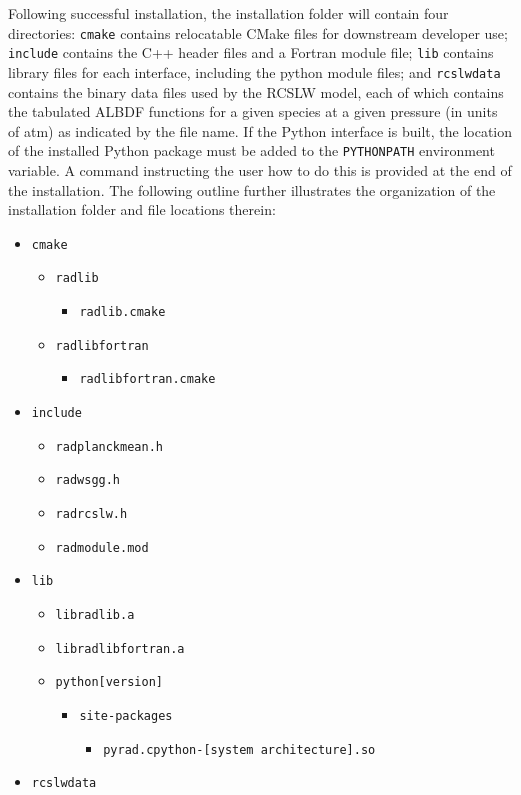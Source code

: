 \documentclass[preprint,12pt]{elsarticle}
\begin{document}
Following successful installation, the installation folder will contain four directories:
\texttt{cmake} contains relocatable CMake files for downstream developer use;
\texttt{include} contains the C++ header files and a Fortran module file;
\texttt{lib} contains library files for each interface, including the python module files;
and \texttt{rcslw\textunderscore data} contains the binary data files used by the RCSLW model, each of which
contains the tabulated ALBDF functions for a given species at a given pressure (in units of atm) as indicated by the file name. If the Python interface is built, the location of the installed Python package must be added to the \texttt{PYTHONPATH} environment variable. A command instructing the user how to do this is provided at the end of the installation. The following outline further illustrates the organization of the installation folder and file locations therein:
%
\begin{itemize}
    \item \texttt{cmake}
    \begin{itemize}
        \item \texttt{radlib}
        \begin{itemize}
            \item \texttt{radlib.cmake}
        \end{itemize}
        \item \texttt{radlib\textunderscore fortran}
        \begin{itemize}
            \item \texttt{radlib\textunderscore fortran.cmake}
        \end{itemize}
    \end{itemize}
    \item \texttt{include}
    \begin{itemize}
        \item \texttt{rad\textunderscore planck\textunderscore mean.h}
        \item \texttt{rad\textunderscore wsgg.h}
        \item \texttt{rad\textunderscore rcslw.h}
        \item \texttt{rad\textunderscore module.mod}
    \end{itemize}
    \item \texttt{lib}
    \begin{itemize}
        \item \texttt{libradlib.a}
        \item \texttt{libradlib\textunderscore fortran.a}
        \item \texttt{python[version]}
        \begin{itemize}
            \item \texttt{site-packages}
            \begin{itemize}
                \item \texttt{pyrad.cpython-[system architecture].so}
            \end{itemize}
        \end{itemize}
    \end{itemize}
    \item \texttt{rcslw\textunderscore data}
\end{itemize}
%
\end{document}
